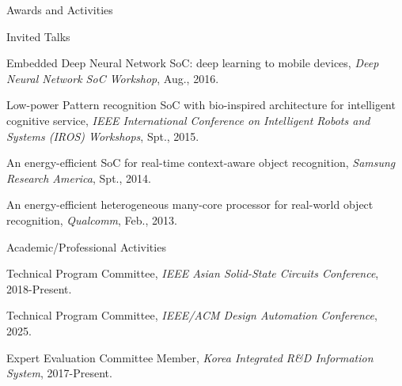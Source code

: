 \documentclass{resume} %
\begin{document}
\begin{section}{Awards and Activities}
\begin{subsection}{Invited Talks}{}{}{}
\item Embedded Deep Neural Network SoC: deep learning to mobile devices,
{\small\textit{Deep Neural Network SoC Workshop}, Aug., 2016.}

\item Low-power Pattern recognition SoC with bio-inspired architecture for intelligent cognitive service,
{\small\textit{IEEE International Conference on Intelligent Robots and Systems (IROS) Workshops}, Spt., 2015.}

\item An energy-efficient SoC for real-time context-aware object recognition,
{\small\textit{Samsung Research America}, Spt., 2014.}

\item An energy-efficient heterogeneous many-core processor for real-world object recognition,
{\small\textit{Qualcomm}, Feb., 2013.}

\end{subsection}

\begin{subsection}{Academic/Professional Activities}{}{}{}

\item Technical Program Committee,
{\small\textit{IEEE Asian Solid-State Circuits Conference}, 2018-Present.}

\item Technical Program Committee,
{\small\textit{IEEE/ACM Design Automation Conference}, 2025.}

\item Expert Evaluation Committee Member,
{\small\textit{Korea Integrated R\&D Information System}, 2017-Present.}

\end{subsection}

\end{section}
\end{document}
